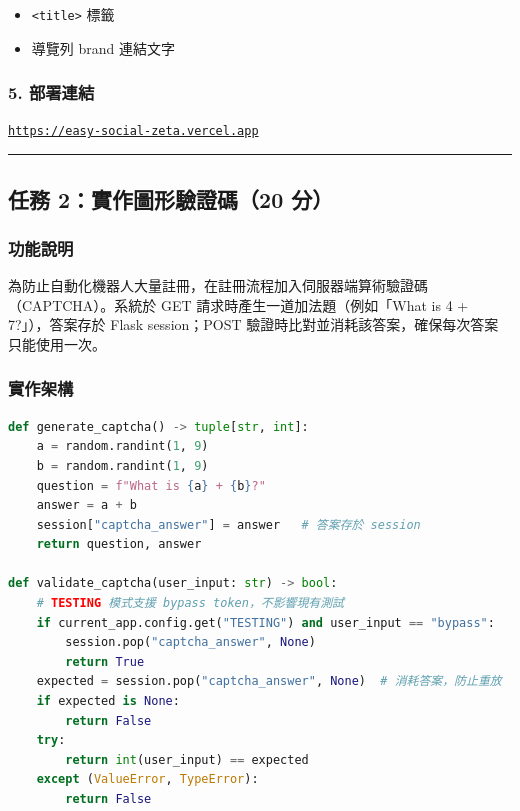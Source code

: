 \documentclass[12pt, a4paper]{article}
\begin{document}
\begin{itemize}[leftmargin=2em]
  \item \texttt{<title>} 標籤
  \item 導覽列 brand 連結文字
\end{itemize}

\subsubsection*{5. 部署連結}

\begin{tcolorbox}[colback=lightblue, colframe=accent, title=部署連結]
\href{https://easy-social-zeta.vercel.app}{\texttt{https://easy-social-zeta.vercel.app}}
\end{tcolorbox}

\bigskip
\hrule
\bigskip

\subsection*{任務 2：實作圖形驗證碼（20 分）}

\subsubsection*{功能說明}

為防止自動化機器人大量註冊，在註冊流程加入伺服器端算術驗證碼（CAPTCHA）。系統於 GET 請求時產生一道加法題（例如「What is 4 + 7?」），答案存於 Flask session；POST 驗證時比對並消耗該答案，確保每次答案只能使用一次。

\subsubsection*{實作架構}

\begin{lstlisting}[language=Python, caption={easy\_social/captcha.py（核心邏輯）}]
def generate_captcha() -> tuple[str, int]:
    a = random.randint(1, 9)
    b = random.randint(1, 9)
    question = f"What is {a} + {b}?"
    answer = a + b
    session["captcha_answer"] = answer   # 答案存於 session
    return question, answer

def validate_captcha(user_input: str) -> bool:
    # TESTING 模式支援 bypass token，不影響現有測試
    if current_app.config.get("TESTING") and user_input == "bypass":
        session.pop("captcha_answer", None)
        return True
    expected = session.pop("captcha_answer", None)  # 消耗答案，防止重放
    if expected is None:
        return False
    try:
        return int(user_input) == expected
    except (ValueError, TypeError):
        return False
\end{lstlisting}
\end{document}
